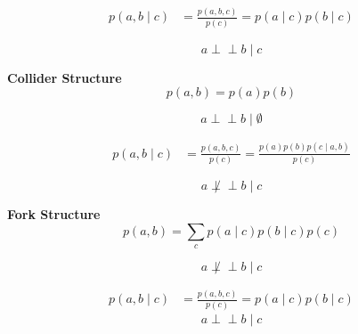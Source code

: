 \documentclass{article}
\def\ci{\perp\!\!\!\perp}
\begin{document}
\begin{equation}
    \begin{aligned}
    p(a, b \mid c) &=\frac{p(a, b, c)}{p(c)} =p(a \mid c) p(b \mid c)
    \end{aligned}
\end{equation}

\begin{equation}
    a  \ci b \mid c
\end{equation}

\textbf{Collider Structure}
\begin{equation}
    p(a, b)=p(a) p(b)
\end{equation}

\begin{equation}
    a \ci b \mid \emptyset
\end{equation}

\begin{equation}
    \begin{aligned}
    p(a, b \mid c) &=\frac{p(a, b, c)}{p(c)} =\frac{p(a) p(b) p(c \mid a, b)}{p(c)}
    \end{aligned}
\end{equation}

\begin{equation}
    a \not \ci b \mid c
\end{equation}

\textbf{Fork Structure}
\begin{equation}
    p(a, b)=\sum_{c} p(a \mid c) p(b \mid c) p(c)
\end{equation}

\begin{equation}
    a \not \ci b \mid c
\end{equation}


\begin{equation}
    \begin{aligned}
    p(a, b \mid c) &=\frac{p(a, b, c)}{p(c)} =p(a \mid c) p(b \mid c)
    \end{aligned}
\end{equation}
\begin{equation}
    a \ci b \mid c
\end{equation}
\end{document}

